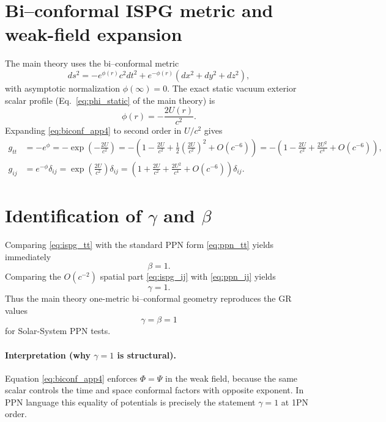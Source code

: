 \documentclass[11pt]{article}
\begin{document}
\section{Bi--conformal ISPG metric and weak-field expansion}\label{sec:ispgexp}
The main theory uses the bi--conformal metric
\begin{equation}
ds^2=-e^{\phi(r)}c^2dt^2+e^{-\phi(r)}\left(dx^2+dy^2+dz^2\right),
\label{eq:biconf_app4}
\end{equation}
with asymptotic normalization $\phi(\infty)=0$. The exact static vacuum exterior scalar profile (Eq.~\eqref{eq:phi_static} of the main theory) is
\begin{equation}
\phi(r)=-\frac{2U(r)}{c^2}.
\label{eq:phiU}
\end{equation}
Expanding \eqref{eq:biconf_app4} to second order in $U/c^2$ gives
\begin{align}
g_{tt} &=-e^{\phi}= -\exp\!\left(-\frac{2U}{c^2}\right)
= -\left(1-\frac{2U}{c^2}+\frac{1}{2}\left(\frac{2U}{c^2}\right)^2+O(c^{-6})\right)= -\left(1-\frac{2U}{c^2}+\frac{2U^2}{c^4}+O(c^{-6})\right),\label{eq:ispg_tt}\\
g_{ij} &= e^{-\phi}\delta_{ij}= \exp\!\left(\frac{2U}{c^2}\right)\delta_{ij}
= \left(1+\frac{2U}{c^2}+\frac{2U^2}{c^4}+O(c^{-6})\right)\delta_{ij}.\label{eq:ispg_ij}
\end{align}

\section{Identification of $\gamma$ and $\beta$}\label{sec:identify}
Comparing \eqref{eq:ispg_tt} with the standard PPN form \eqref{eq:ppn_tt} yields immediately
\begin{equation}
\beta=1.
\label{eq:beta1}
\end{equation}
Comparing the $O(c^{-2})$ spatial part \eqref{eq:ispg_ij} with \eqref{eq:ppn_ij} yields
\begin{equation}
\gamma=1.
\label{eq:gamma1}
\end{equation}
Thus the main theory one-metric bi--conformal geometry reproduces the GR values
\begin{equation}
\gamma=\beta=1
\end{equation}
for Solar-System PPN tests.

\paragraph{Interpretation (why $\gamma=1$ is structural).}
Equation \eqref{eq:biconf_app4} enforces $\Phi=\Psi$ in the weak field, because the same scalar controls the time and space conformal factors with opposite exponent. In PPN language this equality of potentials is precisely the statement $\gamma=1$ at 1PN order.
\end{document}
